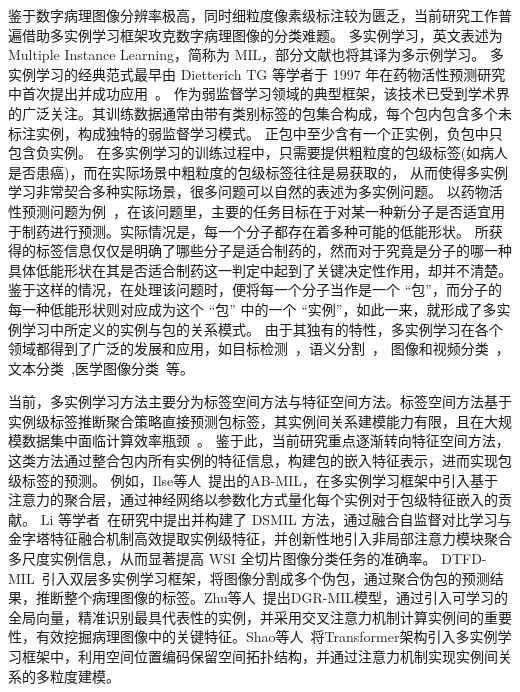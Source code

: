 鉴于数字病理图像分辨率极高，同时细粒度像素级标注较为匮乏，当前研究工作普遍借助多实例学习框架攻克数字病理图像的分类难题。
多实例学习，英文表述为 Multiple Instance Learning，简称为 MIL，部分文献也将其译为多示例学习。
多实例学习的经典范式最早由 Dietterich TG 等学者于 1997 年在药物活性预测研究中首次提出并成功应用~\cite{dietterich1997solving}。
作为弱监督学习领域的典型框架，该技术已受到学术界的广泛关注。其训练数据通常由带有类别标签的包集合构成，每个包内包含多个未标注实例，构成独特的弱监督学习模式。
正包中至少含有一个正实例，负包中只包含负实例。
在多实例学习的训练过程中，只需要提供粗粒度的包级标签(如病人是否患癌)，而在实际场景中粗粒度的包级标签往往是易获取的，
从而使得多实例学习非常契合多种实际场景，很多问题可以自然的表述为多实例问题。
以药物活性预测问题为例~\cite{dietterich1997solving}，在该问题里，主要的任务目标在于对某一种新分子是否适宜用于制药进行预测。实际情况是，每一个分子都存在着多种可能的低能形状。
所获得的标签信息仅仅是明确了哪些分子是适合制药的，然而对于究竟是分子的哪一种具体低能形状在其是否适合制药这一判定中起到了关键决定性作用，却并不清楚。
鉴于这样的情况，在处理该问题时，便将每一个分子当作是一个 “包”，而分子的每一种低能形状则对应成为这个 “包” 中的一个 “实例”，如此一来，就形成了多实例学习中所定义的实例与包的关系模式。
由于其独有的特性，多实例学习在各个领域都得到了广泛的发展和应用，如目标检测~\cite{hoffman2015detector,wu2015deep,陈钰2016基于,tang2018weakly}，语义分割~\cite{xu2019camel}，
图像和视频分类~\cite{唐大伟2014壁画图像分类中的分组多实例学习方法,huang2021weakly,wang2013max,chen2006miles,rahmani2006missl,andrews2002support}，文本分类~\cite{zhou2009multi},医学图像分类~\cite{ilse2018attention,shao2021transmil,zhang2022dtfd,kanavati2020weakly,li2021dual,chikontwe2020multiple}等。

当前，多实例学习方法主要分为标签空间方法与特征空间方法。标签空间方法基于实例级标签推断聚合策略直接预测包标签，其实例间关系建模能力有限，且在大规模数据集中面临计算效率瓶颈~\cite{campanella2019clinical}。
鉴于此，当前研究重点逐渐转向特征空间方法，这类方法通过整合包内所有实例的特征信息，构建包的嵌入特征表示，进而实现包级标签的预测。
例如，Ilse等人~\cite{ilse2018attention}提出的AB-MIL，在多实例学习框架中引入基于注意力的聚合层，通过神经网络以参数化方式量化每个实例对于包级特征嵌入的贡献。
Li 等学者~\cite{li2021dual}在研究中提出并构建了 DSMIL 方法，通过融合自监督对比学习与金字塔特征融合机制高效提取实例级特征，并创新性地引入非局部注意力模块聚合多尺度实例信息，从而显著提高 WSI 全切片图像分类任务的准确率。
DTFD-MIL~\cite{zhang2022dtfd}引入双层多实例学习框架，将图像分割成多个伪包，通过聚合伪包的预测结果，推断整个病理图像的标签。Zhu等人~\cite{zhu2024dgr}提出DGR-MIL模型，通过引入可学习的全局向量，精准识别最具代表性的实例，并采用交叉注意力机制计算实例间的重要性，有效挖掘病理图像中的关键特征。Shao等人~\cite{shao2021transmil}将Transformer架构引入多实例学习框架中，利用空间位置编码保留空间拓扑结构，并通过注意力机制实现实例间关系的多粒度建模。

